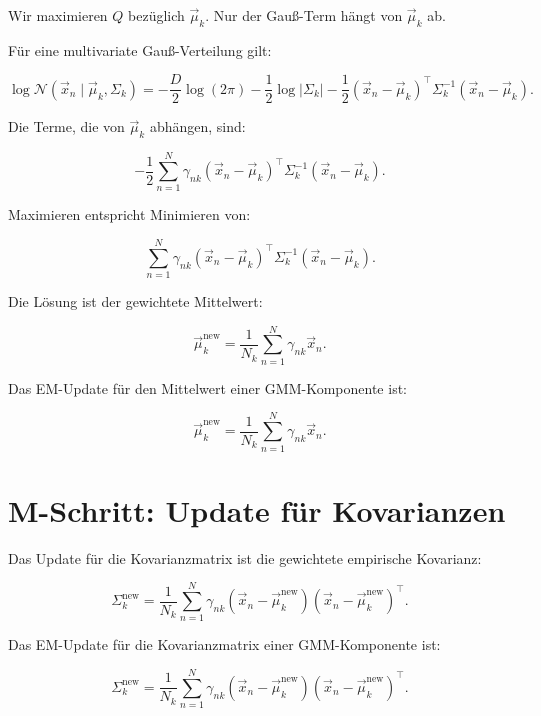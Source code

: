 Wir maximieren \(Q\) bezüglich \(\vec{\mu}_k\).
Nur der Gauß-Term hängt von \(\vec{\mu}_k\) ab.

Für eine multivariate Gauß-Verteilung gilt:

\[
    \log
    \mathcal{N}(\vec{x}_n\mid\vec{\mu}_k,\Sigma_k)
    =
    -\frac{D}{2}\log(2\pi)
    -
    \frac{1}{2}\log|\Sigma_k|
    -
    \frac{1}{2}
    (\vec{x}_n-\vec{\mu}_k)^{\top}
    \Sigma_k^{-1}
    (\vec{x}_n-\vec{\mu}_k).
\]

Die Terme, die von \(\vec{\mu}_k\) abhängen, sind:

\[
    -\frac{1}{2}
    \sum_{n=1}^{N}
    \gamma_{nk}
    (\vec{x}_n-\vec{\mu}_k)^{\top}
    \Sigma_k^{-1}
    (\vec{x}_n-\vec{\mu}_k).
\]

Maximieren entspricht Minimieren von:

\[
    \sum_{n=1}^{N}
    \gamma_{nk}
    (\vec{x}_n-\vec{\mu}_k)^{\top}
    \Sigma_k^{-1}
    (\vec{x}_n-\vec{\mu}_k).
\]

Die Lösung ist der gewichtete Mittelwert:

\[
    \vec{\mu}_k^{\mathrm{new}}
    =
    \frac{1}{N_k}
    \sum_{n=1}^{N}
    \gamma_{nk}
    \vec{x}_n.
\]

\begin{definitionbox}
Das EM-Update für den Mittelwert einer GMM-Komponente ist:

\[
    \vec{\mu}_k^{\mathrm{new}}
    =
    \frac{1}{N_k}
    \sum_{n=1}^{N}
    \gamma_{nk}
    \vec{x}_n.
\]
\end{definitionbox}

\section{M-Schritt: Update für Kovarianzen}

Das Update für die Kovarianzmatrix ist die gewichtete empirische Kovarianz:

\[
    \Sigma_k^{\mathrm{new}}
    =
    \frac{1}{N_k}
    \sum_{n=1}^{N}
    \gamma_{nk}
    (\vec{x}_n-\vec{\mu}_k^{\mathrm{new}})
    (\vec{x}_n-\vec{\mu}_k^{\mathrm{new}})^{\top}.
\]

\begin{definitionbox}
Das EM-Update für die Kovarianzmatrix einer GMM-Komponente ist:

\[
    \Sigma_k^{\mathrm{new}}
    =
    \frac{1}{N_k}
    \sum_{n=1}^{N}
    \gamma_{nk}
    (\vec{x}_n-\vec{\mu}_k^{\mathrm{new}})
    (\vec{x}_n-\vec{\mu}_k^{\mathrm{new}})^{\top}.
\]
\end{definitionbox}

